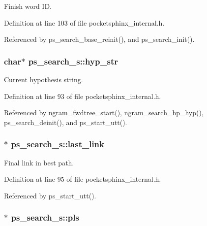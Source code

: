 \-Finish word \-I\-D. 



\-Definition at line 103 of file pocketsphinx\-\_\-internal.\-h.



\-Referenced by ps\-\_\-search\-\_\-base\-\_\-reinit(), and ps\-\_\-search\-\_\-init().

\subsubsection[{hyp\-\_\-str}]{\setlength{\rightskip}{0pt plus 5cm}char$\ast$ {\bf ps\-\_\-search\-\_\-s\-::hyp\-\_\-str}}\label{structps__search__s_aa398c736a887af97e42b2a562359adc3}


\-Current hypothesis string. 



\-Definition at line 93 of file pocketsphinx\-\_\-internal.\-h.



\-Referenced by ngram\-\_\-fwdtree\-\_\-start(), ngram\-\_\-search\-\_\-bp\-\_\-hyp(), ps\-\_\-search\-\_\-deinit(), and ps\-\_\-start\-\_\-utt().

\subsubsection[{last\-\_\-link}]{$\ast$ {\bf ps\-\_\-search\-\_\-s\-::last\-\_\-link}}\label{structps__search__s_aa3020ef7bd4e56713dfe2fbad52e6e4f}


\-Final link in best path. 



\-Definition at line 95 of file pocketsphinx\-\_\-internal.\-h.



\-Referenced by ps\-\_\-start\-\_\-utt().

\subsubsection[{pls}]{$\ast$ {\bf ps\-\_\-search\-\_\-s\-::pls}}\label{structps__search__s_a2a33b7698fb237b42e007788f65cd46c}



